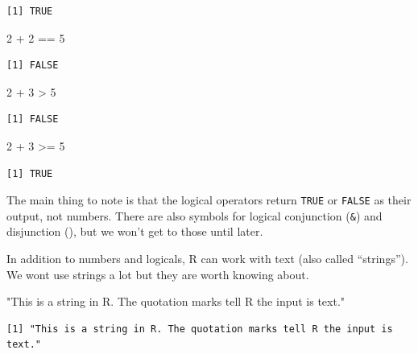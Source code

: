 \documentclass[
  letterpaper,
  DIV=11,
  numbers=noendperiod]{scrreprt}
\newenvironment{Shaded}{\begin{snugshade}}{\end{snugshade}}
\newcommand{\DecValTok}[1]{\textcolor[rgb]{0.68,0.00,0.00}{#1}}
\newcommand{\SpecialCharTok}[1]{\textcolor[rgb]{0.37,0.37,0.37}{#1}}
\newcommand{\StringTok}[1]{\textcolor[rgb]{0.13,0.47,0.30}{#1}}
\begin{document}
\begin{verbatim}
[1] TRUE
\end{verbatim}

\begin{Shaded}
\begin{Highlighting}[]
\DecValTok{2} \SpecialCharTok{+} \DecValTok{2} \SpecialCharTok{==} \DecValTok{5}
\end{Highlighting}
\end{Shaded}

\begin{verbatim}
[1] FALSE
\end{verbatim}

\begin{Shaded}
\begin{Highlighting}[]
\DecValTok{2} \SpecialCharTok{+} \DecValTok{3} \SpecialCharTok{\textgreater{}} \DecValTok{5}
\end{Highlighting}
\end{Shaded}

\begin{verbatim}
[1] FALSE
\end{verbatim}

\begin{Shaded}
\begin{Highlighting}[]
\DecValTok{2} \SpecialCharTok{+} \DecValTok{3} \SpecialCharTok{\textgreater{}=} \DecValTok{5}
\end{Highlighting}
\end{Shaded}

\begin{verbatim}
[1] TRUE
\end{verbatim}

The main thing to note is that the logical operators return
\texttt{TRUE} or \texttt{FALSE} as their output, not numbers. There are
also symbols for logical conjunction (\texttt{\&}) and disjunction
(\texttt{\textbar{}}), but we won't get to those until later.

In addition to numbers and logicals, R can work with text (also called
``strings''). We wont use strings a lot but they are worth knowing
about.

\begin{Shaded}
\begin{Highlighting}[]
\StringTok{"This is a string in R. The quotation marks tell R the input is text."}
\end{Highlighting}
\end{Shaded}

\begin{verbatim}
[1] "This is a string in R. The quotation marks tell R the input is text."
\end{verbatim}
\end{document}
